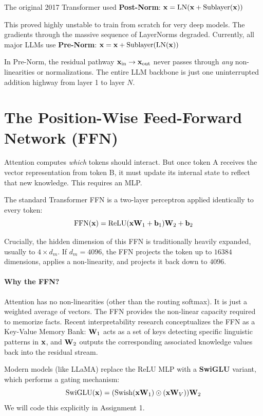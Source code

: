 The original 2017 Transformer used \textbf{Post-Norm}:
$\mathbf{x} = \text{LN}(\mathbf{x} + \text{Sublayer}(\mathbf{x}))$

This proved highly unstable to train from scratch for very deep models. The gradients through the massive sequence of LayerNorms degraded. Currently, all major LLMs use \textbf{Pre-Norm}:
$\mathbf{x} = \mathbf{x} + \text{Sublayer}(\text{LN}(\mathbf{x}))$

In Pre-Norm, the residual pathway $\mathbf{x}_{\text{in}} \rightarrow \mathbf{x}_{\text{out}}$ never passes through \emph{any} non-linearities or normalizations. The entire LLM backbone is just one uninterrupted addition highway from layer 1 to layer $N$.

\section{The Position-Wise Feed-Forward Network (FFN)}

Attention computes \emph{which} tokens should interact. But once token A receives the vector representation from token B, it must update its internal state to reflect that new knowledge. This requires an MLP.

The standard Transformer FFN is a two-layer perceptron applied identically to every token:
\begin{equation}
\text{FFN}(\mathbf{x}) = \text{ReLU}(\mathbf{x} \mathbf{W}_1 + \mathbf{b}_1) \mathbf{W}_2 + \mathbf{b}_2
\end{equation}

Crucially, the hidden dimension of this FFN is traditionally heavily expanded, usually to $4 \times d_m$. If $d_m = 4096$, the FFN projects the token up to $16384$ dimensions, applies a non-linearity, and projects it back down to $4096$.

\paragraph{Why the FFN?}
Attention has no non-linearities (other than the routing softmax). It is just a weighted average of vectors. The FFN provides the non-linear capacity required to memorize facts. Recent interpretability research conceptualizes the FFN as a Key-Value Memory Bank: $\mathbf{W}_1$ acts as a set of keys detecting specific linguistic patterns in $\mathbf{x}$, and $\mathbf{W}_2$ outputs the corresponding associated knowledge values back into the residual stream.

Modern models (like LLaMA) replace the ReLU MLP with a \textbf{SwiGLU} variant, which performs a gating mechanism:
\begin{equation}
\text{SwiGLU}(\mathbf{x}) = (\text{Swish}(\mathbf{x}\mathbf{W}_1) \odot (\mathbf{x}\mathbf{W}_V)) \mathbf{W}_2
\end{equation}
We will code this explicitly in Assignment 1.

